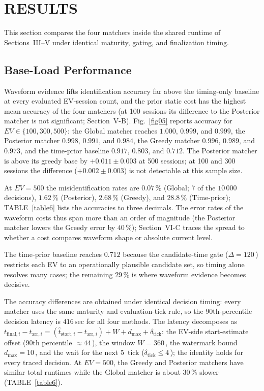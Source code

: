 \documentclass{ieeeaccess}
\newif\ifhighlight \highlightfalse
\DeclareRobustCommand{\revised}[1]{\ifhighlight{\color{blue}#1}\else{\color{.}#1}\fi}
\begin{document}
    \section{\revised{RESULTS}}

    \revised{This section compares the four matchers inside the shared runtime of Sections~III--V under identical maturity, gating, and finalization timing.}

    \subsection{Base-Load Performance}
    \revised{Waveform evidence lifts identification accuracy far above the timing-only baseline at every evaluated EV-session count, and the prior static cost has the highest mean accuracy of the four matchers (at 100 sessions its difference to the Posterior matcher is not significant; Section~V-B).
    Fig.~\ref{fig05} reports accuracy for $EV \in \{100, 300, 500\}$: the Global matcher reaches $1.000$, $0.999$, and $0.999$, the Posterior matcher $0.998$, $0.991$, and $0.984$, the Greedy matcher $0.996$, $0.989$, and $0.973$, and the time-prior baseline $0.917$, $0.803$, and $0.712$.
    The Posterior matcher is above its greedy base by $+0.011 \pm 0.003$ at 500 sessions; at 100 and 300 sessions the difference ($+0.002 \pm 0.003$) is not detectable at this sample size.

    At $EV = 500$ the misidentification rates are $0.07\,\%$ (Global; 7 of the $10\,000$ decisions), $1.62\,\%$ (Posterior), $2.68\,\%$ (Greedy), and $28.8\,\%$ (Time-prior); TABLE~\ref{table6} lists the accuracies to three decimals.
    The error rates of the waveform costs thus span more than an order of magnitude (the Posterior matcher lowers the Greedy error by $40\,\%$); Section~VI-C traces the spread to whether a cost compares waveform shape or absolute current level.}
    The time-prior baseline reaches \revised{$0.712$} because the candidate-time gate ($\Delta = 120$\,) restricts each EV to an operationally plausible candidate set, so timing alone resolves many cases; the remaining $29\,\%$ is where waveform evidence becomes decisive.

    The accuracy \revised{differences are} obtained under identical decision timing: every matcher uses the same maturity and evaluation-tick rule, so the 90th-percentile decision latency is $416\,$ for all four methods.
    \revised{The latency decomposes as $t_{\text{final},i} - t_{\text{arr},i} = (\hat{t}_{\text{start},i} - t_{\text{arr},i}) + W + d_{\max} + \delta_{\text{tick}}$: the EV-side start-estimate offset (90th percentile $\approx 44$\,\text{sec}), the window $W = 360$\,\text{sec}, the watermark bound $d_{\max} = 10$\,\text{sec}, and the wait for the next 5\,\text{sec} tick ($\delta_{\text{tick}} \leq 4$\,\text{sec}); the identity holds for every traced decision.}
    At $EV = 500$, the Greedy and Posterior matchers have similar total runtimes while the Global matcher is \revised{about 30\,\%} slower (TABLE~\ref{table6})\revised{.}
\end{document}

